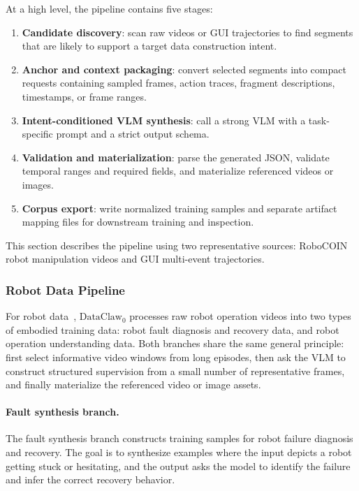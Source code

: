 \documentclass{llmxive}
\begin{document}
At a high level, the pipeline contains five stages:
\begin{enumerate}
    \item \textbf{Candidate discovery}: scan raw videos or GUI trajectories to find segments that are likely to support a target data construction intent.
    \item \textbf{Anchor and context packaging}: convert selected segments into compact requests containing sampled frames, action traces, fragment descriptions, timestamps, or frame ranges.
    \item \textbf{Intent-conditioned VLM synthesis}: call a strong VLM with a task-specific prompt and a strict output schema.
    \item \textbf{Validation and materialization}: parse the generated JSON, validate temporal ranges and required fields, and materialize referenced videos or images.
    \item \textbf{Corpus export}: write normalized training samples and separate artifact mapping files for downstream training and inspection.
\end{enumerate}

This section describes the pipeline using two representative sources: RoboCOIN robot manipulation videos and GUI multi-event trajectories.

\subsubsection{Robot Data Pipeline}
\label{app:robocoin_pipeline}

For robot data~\cite{agibot,robocoin}, $\text{DataClaw}_0$ processes raw robot operation videos into two types of embodied training data: robot fault diagnosis and recovery data, and robot operation understanding data. Both branches share the same general principle: first select informative video windows from long episodes, then ask the VLM to construct structured supervision from a small number of representative frames, and finally materialize the referenced video or image assets.

\paragraph{Fault synthesis branch.}
The fault synthesis branch constructs training samples for robot failure diagnosis and recovery. The goal is to synthesize examples where the input depicts a robot getting stuck or hesitating, and the output asks the model to identify the failure and infer the correct recovery behavior.
\end{document}
